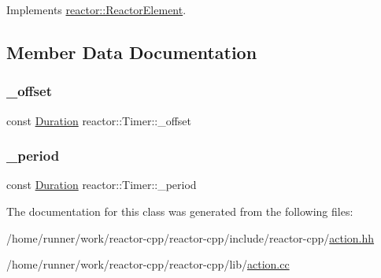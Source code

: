 Implements \hyperlink{classreactor_1_1ReactorElement_a8cb574cb20ff963903ad905fb0a157e3}{reactor\+::\+Reactor\+Element}.



\subsection{Member Data Documentation}
\mbox{\label{classreactor_1_1Timer_ae3f332ade1a8caf90db054024dcf931b}} 
\subsubsection{\texorpdfstring{\+\_\+offset}{\_offset}}
{\footnotesize\ttfamily const \hyperlink{namespacereactor_aa8375b807a80703545664096c5b5b779}{Duration} reactor\+::\+Timer\+::\+\_\+offset\hspace{0.3cm}{\ttfamily [private]}}

\mbox{\label{classreactor_1_1Timer_a3524de2cc02985e98ee7115300adc452}} 
\subsubsection{\texorpdfstring{\+\_\+period}{\_period}}
{\footnotesize\ttfamily const \hyperlink{namespacereactor_aa8375b807a80703545664096c5b5b779}{Duration} reactor\+::\+Timer\+::\+\_\+period\hspace{0.3cm}{\ttfamily [private]}}



The documentation for this class was generated from the following files\+:\begin{DoxyCompactItemize}
\item 
/home/runner/work/reactor-\/cpp/reactor-\/cpp/include/reactor-\/cpp/\hyperlink{action_8hh}{action.\+hh}\item 
/home/runner/work/reactor-\/cpp/reactor-\/cpp/lib/\hyperlink{action_8cc}{action.\+cc}\end{DoxyCompactItemize}
